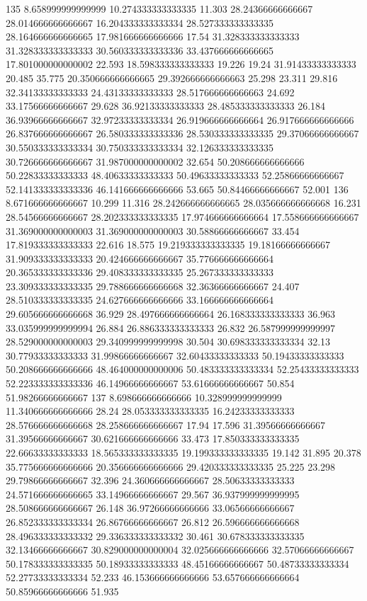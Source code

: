 135 8.658999999999999 10.274333333333335 11.303 28.24366666666667 28.014666666666667 16.204333333333334 28.527333333333335 28.164666666666665 17.981666666666666 17.54 31.328333333333333 31.328333333333333 30.560333333333336 33.437666666666665 17.801000000000002 22.593 18.598333333333333 19.226 19.24 31.91433333333333 20.485 35.775 20.350666666666665 29.392666666666663 25.298 23.311 29.816 32.34133333333333 24.43133333333333 28.517666666666663 24.692 33.17566666666667 29.628 36.92133333333333 28.485333333333333 26.184 36.93966666666667 32.97233333333334 26.919666666666664 26.917666666666666 26.837666666666667 26.580333333333336 28.530333333333335 29.37066666666667 30.550333333333334 30.750333333333334 32.126333333333335 30.726666666666667 31.987000000000002 32.654 50.208666666666666 50.22833333333333 48.40633333333333 50.49633333333333 52.25866666666667 52.141333333333336 46.141666666666666 53.665 50.84466666666667 52.001
136 8.671666666666667 10.299 11.316 28.242666666666665 28.035666666666668 16.231 28.54566666666667 28.202333333333335 17.974666666666664 17.558666666666667 31.369000000000003 31.369000000000003 30.58866666666667 33.454 17.819333333333333 22.616 18.575 19.219333333333335 19.18166666666667 31.909333333333333 20.424666666666667 35.776666666666664 20.365333333333336 29.408333333333335 25.267333333333333 23.309333333333335 29.788666666666668 32.36366666666667 24.407 28.510333333333335 24.627666666666666 33.166666666666664 29.605666666666668 36.929 28.497666666666664 26.168333333333333 36.963 33.035999999999994 26.884 26.886333333333333 26.832 26.587999999999997 28.529000000000003 29.340999999999998 30.504 30.698333333333334 32.13 30.77933333333333 31.99866666666667 32.60433333333333 50.19433333333333 50.208666666666666 48.464000000000006 50.483333333333334 52.25433333333333 52.223333333333336 46.14966666666667 53.61666666666667 50.854 51.98266666666667
137 8.698666666666666 10.328999999999999 11.340666666666666 28.24 28.053333333333335 16.24233333333333 28.576666666666668 28.258666666666667 17.94 17.596 31.39566666666667 31.39566666666667 30.621666666666666 33.473 17.850333333333335 22.66633333333333 18.565333333333335 19.199333333333335 19.142 31.895 20.378 35.775666666666666 20.356666666666666 29.420333333333335 25.225 23.298 29.79866666666667 32.396 24.360666666666667 28.50633333333333 24.571666666666665 33.14966666666667 29.567 36.937999999999995 28.508666666666667 26.148 36.97266666666666 33.06566666666667 26.852333333333334 26.86766666666667 26.812 26.596666666666668 28.496333333333332 29.336333333333332 30.461 30.678333333333335 32.13466666666667 30.829000000000004 32.025666666666666 32.57066666666667 50.178333333333335 50.18933333333333 48.45166666666667 50.48733333333334 52.27733333333334 52.233 46.153666666666666 53.657666666666664 50.85966666666666 51.935

